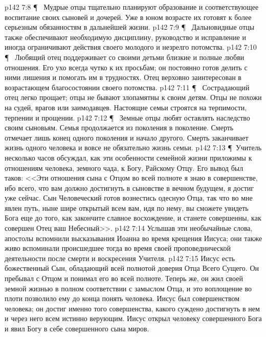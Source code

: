 \vs p142 7:8 \P\ \bibnobreakspace {} Мудрые отцы тщательно планируют образование и соответствующее воспитание своих сыновей и дочерей. Уже в юном возрасте их готовят к более серьезным обязанностям в дальнейшей жизни.
\vs p142 7:9 \P\ \bibnobreakspace {} Дальновидные отцы также обеспечивают необходимую дисциплину, руководство и исправление и иногда ограничивают действия своего молодого и незрелго потомства.
\vs p142 7:10 \P\ \bibnobreakspace {} Любящий отец поддерживает со своими детьми близкие и полные любви отношения. Его ухо всегда чутко к их просьбам; он постоянно готов делить с ними лишения и помогать им в трудностях. Отец верховно заинтересован в возрастающем благосостоянии своего потомства.
\vs p142 7:11 \P\ \bibnobreakspace {} Сострадающий отец легко прощает; отцы не бывают злопамятны к своим детям. Отцы не похожи на судей, врагов или заимодавцев. Настоящие семьи строятся на терпимости, терпении и прощении.
\vs p142 7:12 \P\ \bibnobreakspace {} Земные отцы любят оставлять наследство своим сыновьям. Семья продолжается из поколения в поколение. Смерть отмечает лишь конец одного поколения и начало другого. Смерть заканчивает жизнь одного человека и вовсе не обязательно жизнь семьи.
\vs p142 7:13 \P\ Учитель несколько часов обсуждал, как эти особенности семейной жизни приложимы к отношениям человека, земного чада, к Богу, Райскому Отцу. Его вывод был таков: <<Эти отношения сына с Отцом во всей полноте я знаю в совершенстве, ибо всего, что вам должно достигнуть в сыновстве в вечном будущем, я достиг уже сейчас. Сын Человеческий готов вознестись одесную Отца, так что во мне явлен путь, ныне шире открытый всем вам, идя по нему, вы сможете увидеть Бога еще до того, как закончите славное восхождение, и станете совершенны, как совершен Отец ваш Небесный>>.
\vs p142 7:14 Услышав эти необычайные слова, апостолы вспомнили высказывания Иоанна во время крещения Иисуса; они также живо вспоминали происшедшее тогда во время своей проповеднической деятельности после смерти и воскресения Учителя.
\vs p142 7:15 Иисус есть божественный Сын, обладающий всей полнотой доверия Отца Всего Сущего. Он пребывал с Отцом и понимал его во всей полноте. Теперь же, он жил своей земной жизнью в полном соответствии с замыслом Отца, и это воплощение во плоти позволило ему до конца понять человека. Иисус был совершенством человека; он достиг именно того совершенства, какого суждено достигнуть в нем и через него всем истинно верующим. Иисус открыл человеку совершенного Бога и явил Богу в себе совершенного сына миров.
